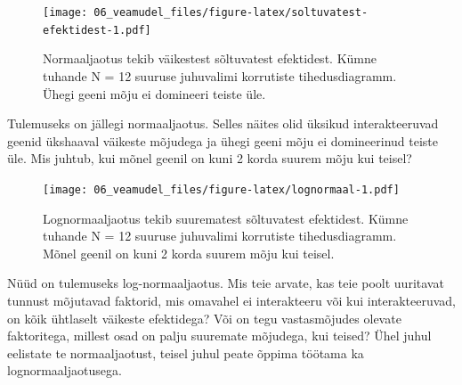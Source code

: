 \documentclass[]{book}
\newenvironment{Shaded}{\begin{snugshade}}{\end{snugshade}}
\newcommand{\KeywordTok}[1]{\textcolor[rgb]{0.13,0.29,0.53}{\textbf{#1}}}
\newcommand{\DecValTok}[1]{\textcolor[rgb]{0.00,0.00,0.81}{#1}}
\newcommand{\FloatTok}[1]{\textcolor[rgb]{0.00,0.00,0.81}{#1}}
\newcommand{\StringTok}[1]{\textcolor[rgb]{0.31,0.60,0.02}{#1}}
\newcommand{\OperatorTok}[1]{\textcolor[rgb]{0.81,0.36,0.00}{\textbf{#1}}}
\newcommand{\NormalTok}[1]{#1}
\begin{document}
\begin{Shaded}
\end{Shaded}

\begin{figure}
\centering
\texttt{[image: 06\_veamudel\_files/figure-latex/soltuvatest-efektidest-1.pdf]}
\caption{\label{fig:soltuvatest-efektidest}Normaaljaotus tekib väikestest sõltuvatest
efektidest. Kümne tuhande N = 12 suuruse juhuvalimi korrutiste
tihedusdiagramm. Ühegi geeni mõju ei domineeri teiste üle.}
\end{figure}

Tulemuseks on jällegi normaaljaotus. Selles näites olid üksikud
interakteeruvad geenid ükshaaval väikeste mõjudega ja ühegi geeni mõju
ei domineerinud teiste üle. Mis juhtub, kui mõnel geenil on kuni 2 korda
suurem mõju kui teisel?





\begin{Shaded}
\end{Shaded}

\begin{figure}
\centering
\texttt{[image: 06\_veamudel\_files/figure-latex/lognormaal-1.pdf]}
\caption{\label{fig:lognormaal}Lognormaaljaotus tekib suurematest sõltuvatest
efektidest. Kümne tuhande N = 12 suuruse juhuvalimi korrutiste
tihedusdiagramm. Mõnel geenil on kuni 2 korda suurem mõju kui teisel.}
\end{figure}

Nüüd on tulemuseks log-normaaljaotus. Mis teie arvate, kas teie poolt
uuritavat tunnust mõjutavad faktorid, mis omavahel ei interakteeru või
kui interakteeruvad, on kõik ühtlaselt väikeste efektidega? Või on tegu
vastasmõjudes olevate faktoritega, millest osad on palju suuremate
mõjudega, kui teised? Ühel juhul eelistate te normaaljaotust, teisel
juhul peate õppima töötama ka lognormaaljaotusega.
\end{document}
